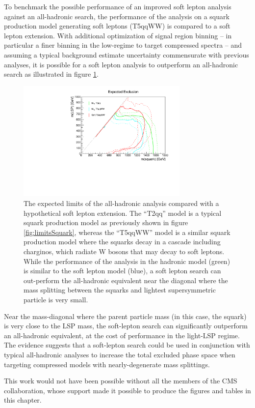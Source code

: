 To benchmark the possible performance of an improved soft lepton analysis against an all-hadronic search, the performance of the \mttwo analysis on a squark production model generating soft leptons (T5qqWW) is compared to a soft lepton extension. With additional optimization of signal region binning -- in particular a finer binning in the low-\MET regime to target compressed spectra -- and assuming a typical background estimate uncertainty commensurate with previous analyses, it is possible for a soft lepton analysis to outperform an all-hadronic search as illustrated in figure \ref{fig:softfuture}. 
\begin{figure}
	\centering
	\includegraphics[width=0.75\textwidth]{soft/figs/expectedSoftLimit.pdf}
	\renewcommand{\baselinestretch}{1.0}
	\caption[The expected limits of the all-hadronic \mttwo analysis compared with a hypothetical soft lepton extension.]{The expected limits of the all-hadronic \mttwo analysis compared with a hypothetical soft lepton extension. The ``T2qq'' model is a typical squark production model as previously shown in figure \ref{fig:limitsSquark}, whereas the ``T5qqWW'' model is a similar squark production model where the squarks decay in a cascade including charginos, which radiate W bosons that may decay to soft leptons. While the performance of the \mttwo analysis in the hadronic model (green) is similar to the soft lepton model (blue), a soft lepton search can out-perform the all-hadronic equivalent near the diagonal where the mass splitting between the squarks and lightest supersymmetric particle is very small.}
	\label{fig:softfuture}
\end{figure}

Near the mass-diagonal where the parent particle mass (in this case, the squark) is very close to the LSP mass, the soft-lepton search can significantly outperform an all-hadronic equivalent, at the cost of performance in the light-LSP regime. The evidence suggests that a soft-lepton search could be used in conjunction with typical all-hadronic analyses to increase the total excluded phase space when targeting compressed models with nearly-degenerate mass splittings.

This work would not have been possible without all the members of the CMS collaboration, whose support made it possible to produce the figures and tables in this chapter.

